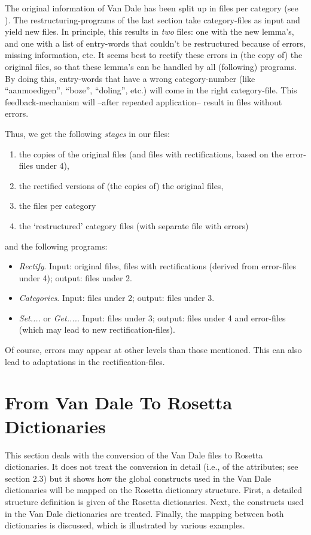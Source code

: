 The original information of Van Dale has been split up in files per category
(see \cite{sm:descr}). 
The restructuring-programs of the last section take category-files as input
and yield new files. In principle, this results in 
{\em two} files: one with the new lemma's, and one with
a list of entry-words that couldn't be restructured because of errors, missing
information, etc. 
It seems best to rectify these errors in (the copy of) the original files,
so that these lemma's can be handled by all (following) programs. By doing 
this, entry-words that have a wrong category-number (like ``aanmoedigen'', 
``boze'', ``doling'', etc.) will come in the right category-file. This 
feedback-mechanism will --after repeated application-- result in files 
without errors.
 
Thus, we get the following {\em stages} in our files:
\begin{enumerate}
  \item the copies of the original files (and files with rectifications,
        based on the error-files under 4),
  \item the rectified versions of (the copies of) the original files,
  \item the files per category
  \item the `restructured' category files (with separate file with errors)
\end{enumerate}
 
and the following programs:
\begin{itemize}
  \item {\em Rectify}. Input: original files, files with rectifications 
        (derived from error-files under 4); output: files under 2.
  \item {\em Categories}. Input: files under 2; output: files under 3.
  \item {\em Set....} or {\em Get....}. Input: files under 3; output: 
        files under 4 and error-files (which may lead to new 
        rectification-files).
\end{itemize}
 
Of course, errors may appear at other levels than those mentioned. This can 
also lead to adaptations in the rectification-files.
 
\newpage
\section{From Van Dale To Rosetta Dictionaries}
 
This section deals with the conversion of the Van Dale files to Rosetta 
dictionaries. 
It does not treat the conversion in detail (i.e., of the attributes; see 
section 2.3) but it shows how the global constructs used in the Van Dale 
dictionaries will 
be mapped on the Rosetta dictionary structure. First, a detailed structure 
definition is given of the Rosetta dictionaries. Next, the constructs used in 
the Van Dale dictionaries are treated. Finally, the mapping between both
dictionaries is discussed, which is illustrated by various examples.
 
